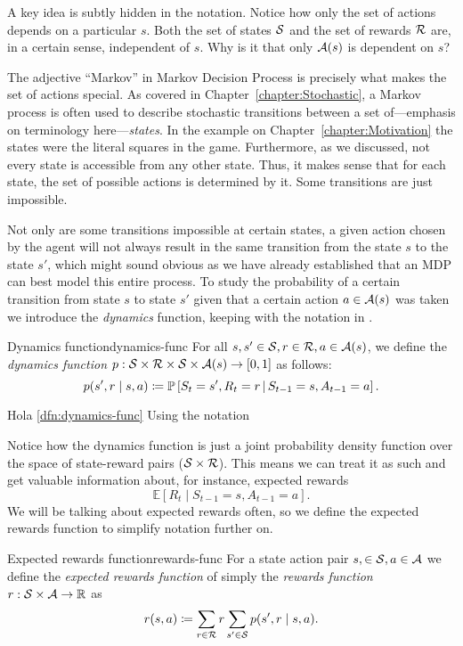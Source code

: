 A key idea is subtly hidden in the notation. Notice how only the set of actions
depends on a particular $s$. Both the set of states $\mathcal{S}$ and the set of
rewards $\mathcal{R}$ are, in a certain sense, independent of $s$. Why is it that
only $\mathcal{A}(s)$ is dependent on $s$?

The adjective ``Markov'' in Markov Decision Process is precisely what makes the
set of actions special. As covered in Chapter~\ref{chapter:Stochastic}, a Markov
process is often used to describe stochastic transitions between a set
of---emphasis on terminology here---\textit{states}. In the example on
Chapter~\ref{chapter:Motivation} the states were the literal squares in the
game. Furthermore, as we discussed, not every state is accessible from any other
state.  Thus, it makes sense that for each state, the set of possible actions is
determined by it. Some transitions are just impossible.

Not only are some transitions impossible at certain states, a given action
chosen by the agent will not always result in the same transition from the state
$s$ to the state $s'$, which might sound obvious as we have already established
that an MDP can best model this entire process. To study the probability
of a certain transition from state $s$ to state $s'$ given that a certain action
$a \in \mathcal{A}(s)$ was taken we introduce the \textit{dynamics} function,
keeping with the notation in \cite{SuttonBarto}.

\begin{dfn}{Dynamics function}{dynamics-func}
	For all $s, s' \in \mathcal{S}, r \in \mathcal{R}, a \in 
	\mathcal{A}(s)$, we define the \emph{dynamics function} $p: 
	\mathcal{S} \times \mathcal{R} \times \mathcal{S} \times \mathcal{A}(s) 
	\to [0, 1]$ as follows:
	\[
		p(s', r \mid s, a) \coloneqq \mathbb{P}\left[S_t = s', R_t = r 
		\,\middle\vert\, S_{t-1} = s, A_{t-1} = a\right].
	\]
\end{dfn}

Hola \ref{dfn:dynamics-func}
Using the notation 

Notice how the dynamics function is just a joint probability density function
over the space of state-reward pairs ($\mathcal{S} \times \mathcal{R}$). This means we
can treat it as such and get valuable information about, for instance, expected
rewards
\[
	\mathbb{E} \left[ R_t \mid S_{t-1} = s, A_{t-1} = a \right].
\]
We will be talking about expected rewards often, so we define the expected
rewards function to simplify notation further on.

\begin{dfn}{Expected rewards function}{rewards-func}
	For a state action pair $s, \in \mathcal{S}, a \in \mathcal{A}$ we define the
	\emph{expected rewards function} of simply the \emph{rewards function} $r:
	\mathcal{S} \times \mathcal{A} \to \mathbb{R}$ as
	\[
		r(s, a) \coloneqq \sum_{r \in \mathcal{R}} r \sum_{s' \in \mathcal{S}} p(s', r \mid s, a).
	\]
\end{dfn}

